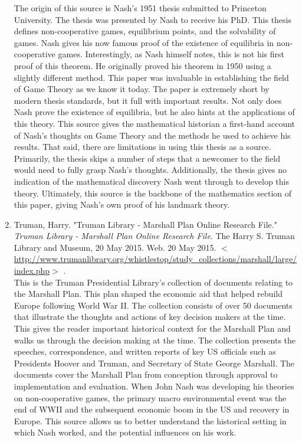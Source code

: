 \documentclass[11pt]{article}
\begin{document}
\begin{enumerate}
The origin of this source is Nash’s 1951 thesis submitted to Princeton University. The thesis was presented by Nash to receive his PhD. This thesis defines non-cooperative games, equilibrium points, and the solvability of games. Nash gives his now famous proof of the existence of equilibria in non-cooperative games. Interestingly, as Nash himself notes, this is not his first proof of this theorem. He originally proved his theorem in 1950 using a slightly different method. This paper was invaluable in establishing the field of Game Theory as we know it today. The paper is extremely short by modern thesis standards, but it full with important results. Not only does Nash prove the existence of equilibria, but he also hints at the applications of this theory. This source gives the mathematical historian a first-hand account of Nash’s thoughts on Game Theory and the methods he used to achieve his results. That said, there are limitations in using this thesis as a source. Primarily, the thesis skips a number of steps that a newcomer to the field would need to fully grasp Nash’s thoughts. Additionally, the thesis gives no indication of the mathematical discovery Nash went through to develop this theory. Ultimately, this source is the backbone of the mathematics section of this paper, giving Nash’s own proof of his landmark theory.\\

\item Truman, Harry. "Truman Library - Marshall Plan Online Research File."  \textit{Truman Library - Marshall Plan Online Research File}. The Harry S. Truman Library and Museum, 20 May 2015. Web. 20 May 2015.  $<$ \url{http://www.trumanlibrary.org/whistlestop/study_collections/marshall/large/index.php}$>$ .\\

This is the Truman Presidential Library’s collection of documents relating to the Marshall Plan. This plan shaped the economic aid that helped rebuild Europe following World War II. The collection consists of over 50 documents that illustrate the thoughts and actions of key decision makers at the time. This gives the reader important historical context for the Marshall Plan and walks us through the decision making at the time. The collection presents the speeches, correspondence, and written reports of key US officials such as Presidents Hoover and Truman, and Secretary of State George Marshall. The documents cover the Marshall Plan from conception through approval to implementation and evaluation. When John Nash was developing his theories on non-cooperative games, the primary macro environmental event was the end of WWII and the subsequent economic boom in the US and recovery in Europe. This source allows us to better understand the historical setting in which Nash worked, and the potential influences on his work.\\


\end{enumerate}
\end{document}
